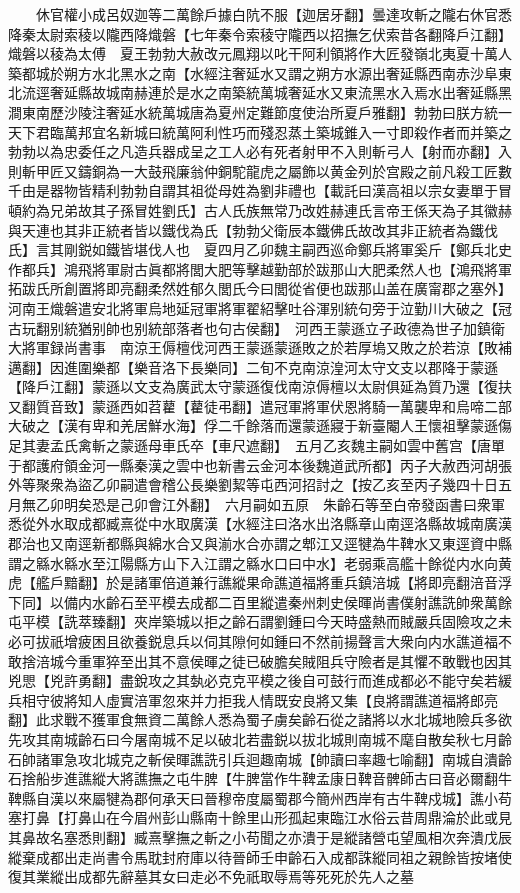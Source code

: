 　　休官權小成呂奴迦等二萬餘戶據白阬不服【迦居牙翻】曇達攻斬之隴右休官悉降秦太尉索稜以隴西降熾磐【七年秦令索稜守隴西以招撫乞伏索昔各翻降戶江翻】熾磐以稜為太傅　夏王勃勃大赦改元鳳翔以叱干阿利領將作大匠發嶺北夷夏十萬人築都城於朔方水北黑水之南【水經注奢延水又謂之朔方水源出奢延縣西南赤沙阜東北流逕奢延縣故城南赫連於是水之南築統萬城奢延水又東流黑水入焉水出奢延縣黑澗東南歷沙陵注奢延水統萬城唐為夏州定難節度使治所夏戶雅翻】勃勃曰朕方統一天下君臨萬邦宜名新城曰統萬阿利性巧而殘忍蒸土築城錐入一寸即殺作者而并築之勃勃以為忠委任之凡造兵器成呈之工人必有死者射甲不入則斬弓人【射而亦翻】入則斬甲匠又鑄銅為一大鼓飛廉翁仲銅駝龍虎之屬飾以黄金列於宫殿之前凡殺工匠數千由是器物皆精利勃勃自謂其祖從母姓為劉非禮也【載託曰漢高祖以宗女妻單于冒頓約為兄弟故其子孫冒姓劉氏】古人氏族無常乃改姓赫連氏言帝王係天為子其徽赫與天連也其非正統者皆以鐵伐為氏【勃勃父衛辰本鐵佛氏故改其非正統者為鐵伐氏】言其剛鋭如鐵皆堪伐人也　夏四月乙卯魏主嗣西巡命鄭兵將軍奚斤【鄭兵北史作都兵】鴻飛將軍尉古眞都將閭大肥等擊越勤部於跋那山大肥柔然人也【鴻飛將軍拓跋氏所創置將即亮翻柔然姓郁久閭氏今曰閭從省便也跋那山盖在廣甯郡之塞外】　河南王熾磐遣安北將軍烏地延冠軍將軍翟紹擊吐谷渾别統句旁于泣勤川大破之【冠古玩翻别統猶别帥也别統部落者也句古侯翻】　河西王蒙遜立子政德為世子加鎮衛大將軍録尚書事　南涼王傉檀伐河西王蒙遜蒙遜敗之於若厚塢又敗之於若涼【敗補邁翻】因進圍樂都【樂音洛下長樂同】二旬不克南涼湟河太守文支以郡降于蒙遜【降戶江翻】蒙遜以文支為廣武太守蒙遜復伐南涼傉檀以太尉俱延為質乃還【復扶又翻質音致】蒙遜西如苕藋【藋徒弔翻】遣冠軍將軍伏恩將騎一萬襲卑和烏啼二部大破之【漢有卑和羌居鮮水海】俘二千餘落而還蒙遜寢于新臺閹人王懷祖擊蒙遜傷足其妻孟氏禽斬之蒙遜母車氏卒【車尺遮翻】　五月乙亥魏主嗣如雲中舊宫【唐單于都護府領金河一縣秦漢之雲中也新書云金河本後魏道武所都】丙子大赦西河胡張外等聚衆為盜乙卯嗣遣會稽公長樂劉絜等屯西河招討之【按乙亥至丙子幾四十日五月無乙卯明矣恐是己卯會江外翻】　六月嗣如五原　朱齡石等至白帝發函書曰衆軍悉從外水取成都臧熹從中水取廣漢【水經注曰洛水出洛縣章山南逕洛縣故城南廣漢郡治也又南逕新都縣與綿水合又與湔水合亦謂之郫江又逕犍為牛鞞水又東逕資中縣謂之緜水緜水至江陽縣方山下入江謂之緜水口曰中水】老弱乘高艦十餘從内水向黄虎【艦戶黯翻】於是諸軍倍道兼行譙縱果命譙道福將重兵鎮涪城【將即亮翻涪音浮下同】以備内水齡石至平模去成都二百里縱遣秦州刺史侯暉尚書僕射譙詵帥衆萬餘屯平模【詵萃臻翻】夾岸築城以拒之齡石謂劉鍾曰今天時盛熱而賊嚴兵固險攻之未必可拔祇增疲困且欲養鋭息兵以伺其隙何如鍾曰不然前揚聲言大衆向内水譙道福不敢捨涪城今重軍猝至出其不意侯暉之徒已破膽矣賊阻兵守險者是其懼不敢戰也因其兇愳【兇許勇翻】盡銳攻之其埶必克克平模之後自可鼓行而進成都必不能守矣若緩兵相守彼將知人虛實涪軍忽來并力拒我人情既安良將又集【良將謂譙道福將郎亮翻】此求戰不獲軍食無資二萬餘人悉為蜀子虜矣齡石從之諸將以水北城地險兵多欲先攻其南城齡石曰今屠南城不足以破北若盡鋭以拔北城則南城不麾自散矣秋七月齡石帥諸軍急攻北城克之斬侯暉譙詵引兵迴趣南城【帥讀曰率趣七喻翻】南城自潰齡石捨船步進譙縱大將譙撫之屯牛脾【牛脾當作牛鞞孟康日鞞音髀師古曰音必爾翻牛鞞縣自漢以來屬犍為郡何承天曰晉穆帝度屬蜀郡今簡州西岸有古牛鞞戍城】譙小苟塞打鼻【打鼻山在今眉州彭山縣南十餘里山形孤起東臨江水俗云昔周鼎淪於此或見其鼻故名塞悉則翻】臧熹擊撫之斬之小苟聞之亦潰于是縱諸營屯望風相次奔潰戊辰縱棄成都出走尚書令馬耽封府庫以待晉師壬申齡石入成都誅縱同祖之親餘皆按堵使復其業縱出成都先辭墓其女曰走必不免祇取辱焉等死死於先人之墓